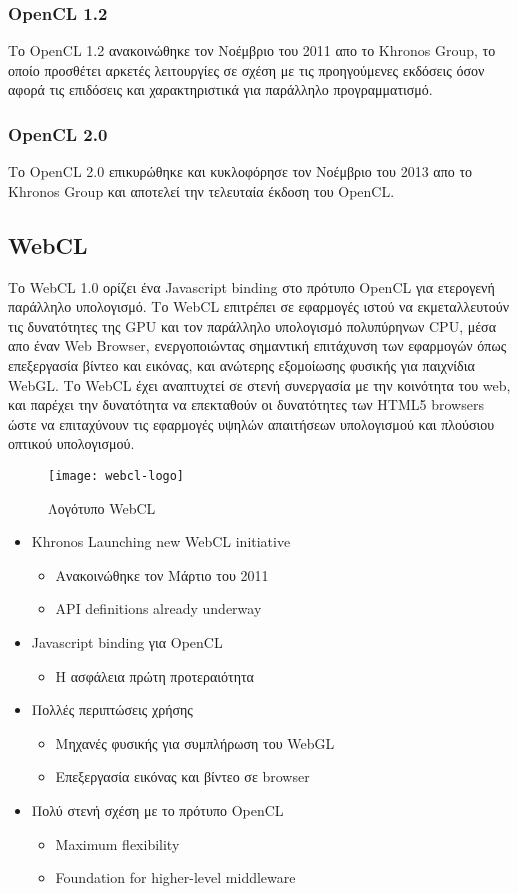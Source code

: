 \subsubsection{OpenCL 1.2} Το OpenCL 1.2 ανακοινώθηκε τον Νοέμβριο του 2011 απο το Khronos Group, το οποίο προσθέτει αρκετές λειτουργίες σε σχέση με τις προηγούμενες εκδόσεις όσον αφορά τις επιδόσεις και χαρακτηριστικά για παράλληλο προγραμματισμό.
\subsubsection{OpenCL 2.0} Το OpenCL 2.0 επικυρώθηκε και κυκλοφόρησε τον Νοέμβριο του 2013 απο το Khronos Group και αποτελεί την τελευταία έκδοση του OpenCL.

\subsection{WebCL}
Το WebCL 1.0 ορίζει ένα Javascript binding στο πρότυπο OpenCL για ετερογενή παράλληλο υπολογισμό. Το WebCL επιτρέπει σε εφαρμογές ιστού να εκμεταλλευτούν τις δυνατότητες της GPU και τον παράλληλο υπολογισμό πολυπύρηνων CPU, μέσα απο έναν Web Browser, ενεργοποιώντας σημαντική επιτάχυνση των εφαρμογών όπως επεξεργασία βίντεο και εικόνας, και ανώτερης εξομοίωσης φυσικής για παιχνίδια WebGL. Το WebCL έχει αναπτυχτεί σε στενή συνεργασία με την κοινότητα του web, και παρέχει την δυνατότητα να επεκταθούν οι δυνατότητες των HTML5 browsers ώστε να επιταχύνουν τις εφαρμογές υψηλών απαιτήσεων υπολογισμού και πλούσιου οπτικού υπολογισμού.
\begin{figure}[h]
	\texttt{[image: webcl-logo]}
	\centering
	\caption{Λογότυπο WebCL}
\end{figure}
\begin{itemize}
\item Khronos Launching new WebCL initiative
	\begin{itemize}
	\item Ανακοινώθηκε τον Μάρτιο του 2011
	\item API definitions already underway
	\end{itemize}
\item Javascript binding για OpenCL
	\begin{itemize}
	\item Η ασφάλεια πρώτη προτεραιότητα
	\end{itemize}
\item Πολλές περιπτώσεις χρήσης
	\begin{itemize}
	\item Μηχανές φυσικής για συμπλήρωση του WebGL
	\item Επεξεργασία εικόνας και βίντεο σε browser
	\end{itemize}
\item Πολύ στενή σχέση με το πρότυπο OpenCL
	\begin{itemize}
	\item Maximum flexibility
	\item Foundation for higher-level middleware
	\end{itemize}
\end{itemize}